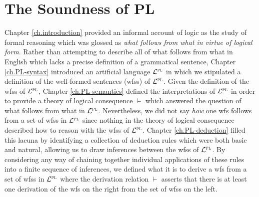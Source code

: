 ﻿%
\chapter{The Soundness of PL}
  \label{ch.PL-Soundness}


Chapter \ref{ch.introduction} provided an informal account of logic as the study of formal reasoning which was glossed as \textit{what follows from what in virtue of logical form}.
Rather than attempting to describe all of what follows from what in English which lacks a precise definition of a grammatical sentence, Chapter \ref{ch.PL-syntax} introduced an artificial language $\mathcal{L}^{\textsc{pl}}$ in which we stipulated a definition of the well-formed sentences (wfss) of $\mathcal{L}^{\textsc{pl}}$.
Given the definition of the wfss of $\mathcal{L}^{\textsc{pl}}$, Chapter \ref{ch.PL-semantics} defined the interpretations of $\mathcal{L}^{\textsc{pl}}$ in order to provide a theory of logical consequence $\vDash$ which answered the question of what follows from what in $\mathcal{L}^{\textsc{pl}}$. 
Nevertheless, we did not say \textit{how} one wfs follows from a set of wfss in $\mathcal{L}^{\textsc{pl}}$ since nothing in the theory of logical consequence described how to reason with the wfss of $\mathcal{L}^{\textsc{pl}}$.
Chapter \ref{ch.PL-deduction} filled this lacuna by identifying a collection of deduction rules which were both basic and natural, allowing us to draw inferences between the wfss of $\mathcal{L}^{\textsc{pl}}$. 
By considering any way of chaining together individual applications of these rules into a finite sequence of inferences, we defined what it is to derive a wfs from a set of wfss in $\mathcal{L}^{\textsc{pl}}$ where the derivation relation $\vdash$ asserts that there is at least one derivation of the wfs on the right from the set of wfss on the left.

